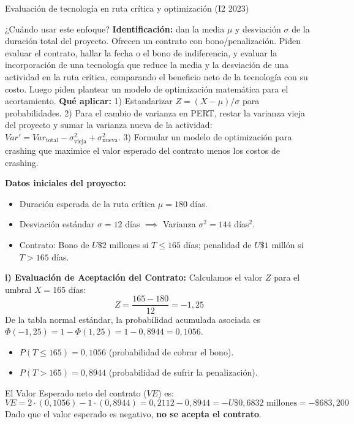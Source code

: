\begin{ejercicio}{Evaluación de tecnología en ruta crítica y optimización (I2 2023)}

\begin{tipprueba}{¿Cuándo usar este enfoque?}
\textbf{Identificación:} dan la media $\mu$ y desviación $\sigma$ de la duración total del proyecto. Ofrecen un contrato con bono/penalización. Piden evaluar el contrato, hallar la fecha o el bono de indiferencia, y evaluar la incorporación de una tecnología que reduce la media y la desviación de una actividad en la ruta crítica, comparando el beneficio neto de la tecnología con su costo. Luego piden plantear un modelo de optimización matemática para el acortamiento.
\textbf{Qué aplicar:}
1) Estandarizar $Z = (X-\mu)/\sigma$ para probabilidades.
2) Para el cambio de varianza en PERT, restar la varianza vieja del proyecto y sumar la varianza nueva de la actividad: $Var' = Var_{\text{total}} - \sigma_{\text{vieja}}^2 + \sigma_{\text{nueva}}^2$.
3) Formular un modelo de optimización para crashing que maximice el valor esperado del contrato menos los costos de crashing.
\end{tipprueba}

\textbf{Datos iniciales del proyecto:}
\begin{itemize}[leftmargin=1.4em, itemsep=1pt]
  \item Duración esperada de la ruta crítica $\mu = 180$ días.
  \item Desviación estándar $\sigma = 12$ días $\implies$ Varianza $\sigma^2 = 144$ días$^2$.
  \item Contrato: Bono de $U\$2$ millones si $T \le 165$ días; penalidad de $U\$1$ millón si $T > 165$ días.
\end{itemize}

\textbf{i) Evaluación de Aceptación del Contrato:}
Calculamos el valor $Z$ para el umbral $X = 165$ días:
\[
  Z = \frac{165 - 180}{12} = -1{,}25
\]
De la tabla normal estándar, la probabilidad acumulada asociada es $\Phi(-1{,}25) = 1 - \Phi(1{,}25) = 1 - 0{,}8944 = 0{,}1056$.
\begin{itemize}[leftmargin=1.4em, itemsep=1pt]
  \item $P(T \le 165) = 0{,}1056$ (probabilidad de cobrar el bono).
  \item $P(T > 165) = 0{,}8944$ (probabilidad de sufrir la penalización).
\end{itemize}
El Valor Esperado neto del contrato ($VE$) es:
\[
  VE = 2 \cdot (0{,}1056) - 1 \cdot (0{,}8944) = 0{,}2112 - 0{,}8944 = -U\$0{,}6832\text{ millones} = -\$683{,}200
\]
Dado que el valor esperado es negativo, \textbf{no se acepta el contrato}.


\end{ejercicio}
